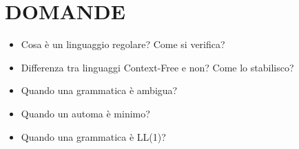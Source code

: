 \documentclass[12pt]{extarticle}
\begin{document}
\newpage
\section{DOMANDE}
\begin{itemize}
    \item Cosa è un linguaggio regolare? Come si verifica?
    \item Differenza tra linguaggi Context-Free e non? Come lo stabilisco?
    \item Quando una grammatica è ambigua?
    \item Quando un automa è minimo?
    \item Quando una grammatica è LL(1)?
\end{itemize}
\end{document}
